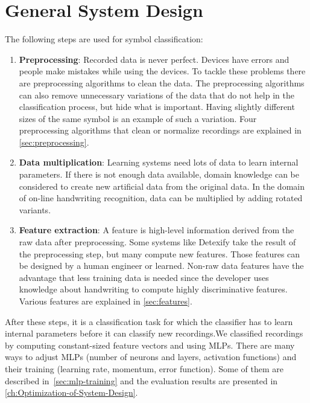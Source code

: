 
\section{General System Design}
The following steps are used for symbol classification:\nobreak
\begin{enumerate}
    \item \textbf{Preprocessing}: Recorded data is never perfect. Devices have
          errors and people make mistakes while using the devices. To tackle
          these problems there are preprocessing algorithms to clean the data.
          The preprocessing algorithms can also remove unnecessary variations
          of the data that do not help in the classification process, but hide
          what is important. Having slightly different sizes of the same symbol
          is an example of such a variation. Four preprocessing algorithms that
          clean or normalize recordings are explained in
          \cref{sec:preprocessing}.
    \item \textbf{Data multiplication}: Learning systems need lots of data
          to learn internal parameters. If there is not enough data available,
          domain knowledge can be considered to create new artificial data from
          the original data. In the domain of on-line handwriting recognition,
          data can be multiplied by adding rotated variants.
    \item \textbf{Feature extraction}: A feature is high-level information
          derived from the raw data after preprocessing. Some systems like
          Detexify take the result of the preprocessing step, but many compute
          new features. Those features can be designed by a human engineer or
          learned. Non-raw data features have the advantage that less
          training data is needed since the developer uses knowledge about
          handwriting to compute highly discriminative features. Various
          features are explained in \cref{sec:features}.
\end{enumerate}

After these steps, it is a classification task for which the classifier has to
learn internal parameters before it can classify new recordings.We classified
recordings by computing constant-sized feature vectors and using
\glspl{MLP}. There are many ways to adjust \glspl{MLP} (number of neurons and
layers, activation functions) and their training (learning rate, momentum,
error function). Some of them are described in~\cref{sec:mlp-training} and the
evaluation results are presented in \cref{ch:Optimization-of-System-Design}.